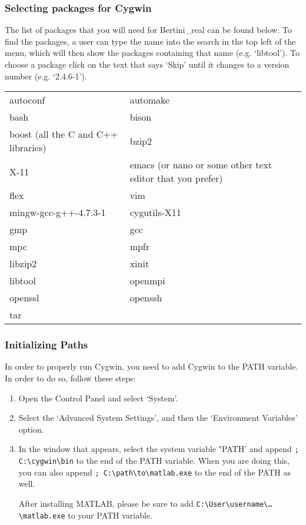 		\subsubsection{Selecting packages for Cygwin}
The list of packages that you will need for Bertini\_real can be found below. To find the packages, a user can type the name into the search in the top left of the menu,  which will then show the packages containing that name (e.g. `libtool'). To choose a package click on the text that says `Skip' until it changes to a version number (e.g. `2.4.6-1'). 

\begin{tabular}{ l l }
  autoconf & automake \\
  bash & bison \\
  boost (all the C and C++ libraries) & bzip2 \\
  X-11 & emacs (or nano or some other text editor that you prefer) \\
  flex & vim \\
  mingw-gcc-g++-4.7.3-1 & cygutils-X11 \\
  gmp & gcc \\
  mpc & mpfr \\
  libzip2 & xinit \\
   libtool & openmpi \\
  openssl& openssh \\
  tar & \\
\end{tabular}


		\subsubsection{Initializing Paths}

In order to properly run Cygwin, you need to add Cygwin to the PATH variable. In order to do so, follow these steps:

\begin{enumerate}

\item Open the Control Panel and select `System'.

\item Select the `Advanced System Settings', and then the `Environment Variables' option. 

\item In the window that appears, select the system variable "PATH' and append \texttt{; C:\textbackslash{cygwin}\textbackslash {bin}} to the end of the PATH variable. When you are doing this, you can also append \texttt{; C:\textbackslash{path}\textbackslash{to}\textbackslash{matlab.exe}} to the end of the PATH as well.

After installing MATLAB, please be sure to add \texttt{C:\textbackslash{User}\textbackslash{username}\textbackslash{\ldots}\textbackslash{matlab.exe}} to your PATH variable. 

\end{enumerate}

